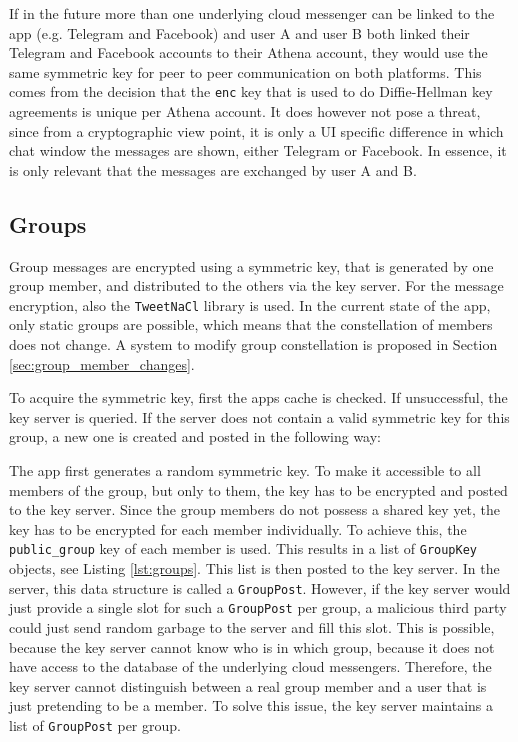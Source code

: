 \documentclass[a4paper, oneside]{discothesis}
\begin{document}
If in the future more than one underlying cloud messenger can be linked to the app (e.g. Telegram and Facebook) and user A and user B both linked their Telegram and Facebook accounts to their Athena account, they would use the same symmetric key for peer to peer communication on both platforms. This comes from the decision that the \texttt{enc} key that is used to do Diffie-Hellman key agreements is unique per Athena account. It does however not pose a threat, since from a cryptographic view point, it is only a UI specific difference in which chat window the messages are shown, either Telegram or Facebook. In essence, it is only relevant that the messages are exchanged by user A and B.

\subsection{Groups}
\label{sec:groups_implementation}

Group messages are encrypted using a symmetric key, that is generated by one group member, and distributed to the others via the key server. For the message encryption, also the \texttt{TweetNaCl} library is used. In the current state of the app, only static groups are possible, which means that the constellation of members does not change. A system to modify group constellation is proposed in Section \ref{sec:group_member_changes}.



To acquire the symmetric key, first the apps cache is checked. If unsuccessful, the key server is queried. If the server does not contain a valid symmetric key for this group, a new one is created and posted in the following way:

The app first generates a random symmetric key. To make it accessible to all members of the group, but only to them, the key has to be encrypted and posted to the key server. Since the group members do not possess a shared key yet, the key has to be encrypted for each member individually. To achieve this, the \texttt{public\_group} key of each member is used. This results in a list of \texttt{GroupKey} objects, see Listing \ref{lst:groups}. This list is then posted to the key server. In the server, this data structure is called a \texttt{GroupPost}. However, if the key server would just provide a single slot for such a \texttt{GroupPost} per group, a malicious third party could just send random garbage to the server and fill this slot. This is possible, because the key server cannot know who is in which group, because it does not have access to the database of the underlying cloud messengers. Therefore, the key server cannot distinguish between a real group member and a user that is just pretending to be a member. To solve this issue, the key server maintains a list of \texttt{GroupPost} per group.
\end{document}
